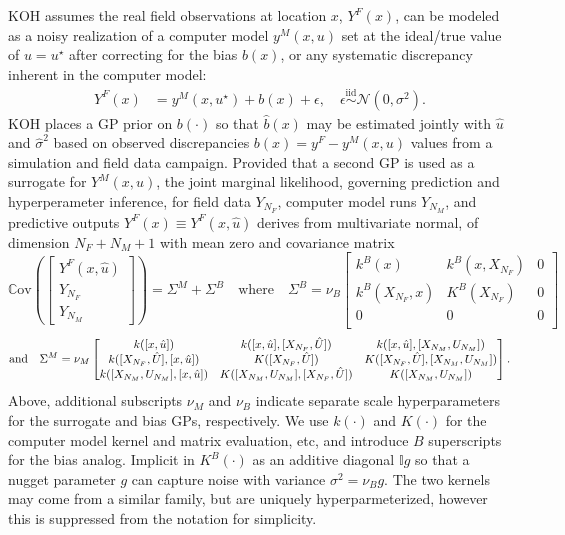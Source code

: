 \documentclass[
]{article}
\begin{document}
KOH assumes the real field observations at location \(x\),
\(Y^F(x)\), can be modeled as a noisy realization of
a computer model \(y^M(x, u)\) set at the ideal/true
value of \(u = u^\star\) after correcting for the bias \(b(x)\),
or any systematic discrepancy inherent in the computer model:
\begin{align}
Y^F(x) &= y^M(x,u^\star) + b(x) + \epsilon \label{eq:modelbias}, \quad \epsilon \stackrel{\mathrm{iid}}{\sim} \mathcal{N}(0, \sigma^2).
\end{align}
KOH places a GP prior on \(b(\cdot)\) so that \(\hat{b}(x)\) may be estimated jointly
with \(\hat{u}\) and \(\hat{\sigma}^2\) based on observed discrepancies \(b(x) = y^F - y^M(x, u)\) values from a simulation and field data campaign. Provided
that a second GP is used as a surrogate for \(Y^M(x,u)\), the joint marginal
likelihood, governing prediction and hyperperameter inference, for field data
\(Y_{N_F}\), computer model runs \(Y_{N_M}\), and predictive outputs \(Y^F(x) \equiv Y^F(x, \hat{u})\) derives from multivariate normal, of dimension
\(N_F + N_M + 1\) with mean zero and covariance matrix
\begin{equation}
\mathbb{C}\mathrm{ov}\left(
\begin{bmatrix}
Y^F(x, \hat{u})\\
Y_{N_F}\\
Y_{N_M}
\end{bmatrix}
\right) = \Sigma^{M}+ \Sigma^B
\quad \mbox{where} \quad 
\Sigma^B
 = \nu_B \begin{bmatrix}
k^B{(x)} &   k^B{(x,X_{N_F})} & 0 \\
k^B{(X_{N_F}, x)} & K^B(X_{N_F}) & 0 \\
0 & 0 & 0\\
\end{bmatrix}
\label{eq:kohimspecov}
\end{equation}
\begin{equation}
\mbox{and} \quad \Sigma^M = \nu_M\begin{bmatrix}
k([x, \hat{u}]) &   k{([x, \hat{u}],[X_{N_F}, \hat{U}])} &  k{([x, \hat{u}],[X_{N_M}, U_{N_M}])}\\
k{([X_{N_F}, \hat{U}], [x, \hat{u}])} & K([X_{N_F}, \hat{U}]) & K([X_{N_F}, \hat{U}],[X_{N_M}, U_{N_M}])\\
k([X_{N_M}, U_{N_M}],[x, \hat{u}]) & K([X_{N_M}, U_{N_M}],[X_{N_F}, \hat{U}]) & K([X_{N_M}, U_{N_M}])
\end{bmatrix}.
\notag
\end{equation}
Above, additional subscripts \(\nu_M\) and \(\nu_B\) indicate separate scale
hyperparameters for the surrogate and bias GPs, respectively. We
use \(k(\cdot)\) and \(K(\cdot)\) for the computer model kernel and matrix
evaluation, etc, and introduce \(B\) superscripts for the bias analog. Implicit
in \(K^B(\cdot)\) as an additive diagonal \(\mathbb{I}g\) so that a nugget
parameter \(g\) can capture noise with variance \(\sigma^2 = \nu_B g\). The two
kernels may come from a similar family, but are uniquely hyperparmeterized,
however this is suppressed from the notation for simplicity.
\end{document}
